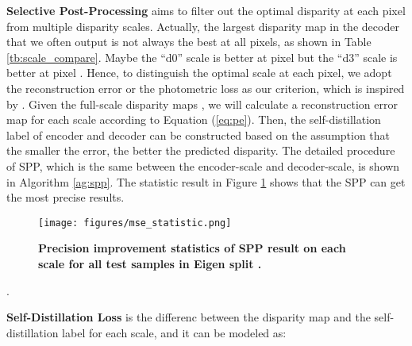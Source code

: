 \documentclass[10pt,twocolumn,letterpaper]{article}
\begin{document}
{\bf Selective Post-Processing} aims to filter out the optimal disparity at each pixel 
from multiple disparity scales. Actually, the largest disparity map in the decoder 
that we often output is not always the best at all pixels, as shown in 
Table \ref{tb:scale_compare}. 
Maybe the ``d0'' scale is better at pixel  but the ``d3'' scale is better at pixel . 
Hence, to distinguish the optimal scale at each pixel, we adopt the reconstruction 
error or the photometric loss as our criterion, which is inspired by \cite{Watson2019}. 
Given the full-scale disparity 
maps , 
we will calculate a reconstruction error map for each scale according to 
Equation (\ref{eq:pe}). Then, the self-distillation label of encoder  and decoder  
can be constructed based on the assumption that the smaller the error, the better the 
predicted disparity. The detailed procedure of SPP, which 
is the same between the encoder-scale and decoder-scale, is shown in 
Algorithm \ref{ag:spp}. The statistic result in Figure \ref{fig:impro_statistic} shows that 
the SPP can get the most precise results.

\begin{figure}[t]
   \begin{center}
      \texttt{[image: figures/mse\_statistic.png]}
   \end{center}
   \vspace{-0.2cm}
      \caption{{\bf Precision improvement statistics of SPP result on each scale for all test 
      samples in Eigen split \cite{Eigen2015}.} }
   \label{fig:impro_statistic}
   \vspace{-0.3cm}
\end{figure}

\begin{algorithm}
   \label{ag:spp}
   \caption{Selective Post-Processing}
   \LinesNumbered
   \;
   \KwRet{}.
\end{algorithm}

{\bf Self-Distillation Loss} is the differenc between the disparity map and the 
self-distillation label for each scale, and it can be modeled as:
\end{document}
